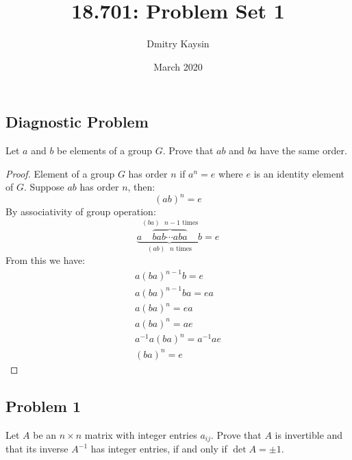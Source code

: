 \documentclass{article}
\title{18.701: Problem Set 1}
\author{Dmitry Kaysin}
\date{March 2020}
\begin{document}
\maketitle 


\subsection*{Diagnostic Problem}

\begin{tcolorbox}
Let $a$ and $b$ be elements of a group $G$. Prove that $ab$ and $ba$ have the same order.
\end{tcolorbox}

\begin{proof}

Element of a group $G$ has order $n$ if $a^n = e$ where $e$ is an identity element of $G$. Suppose $ab$ has order $n$, then:
\[ (ab)^n = e \]
By associativity of group operation:
\[ \underbrace{a\overbrace{bab \cdots aba}^\text{$(ba)$ $n-1$ times} b}_\text{$(ab)$ $n$ times} = e \]
From this we have:
\begin{gather*}
    a(ba)^{n-1}b = e \\
    a(ba)^{n-1}ba = ea \\
    a(ba)^{n} = ea \\
    a(ba)^{n} = ae \\
    a^{-1}a(ba)^{n} = a^{-1}ae \\
    (ba)^{n} = e
\end{gather*}

\end{proof}


\subsection*{Problem 1}

\begin{tcolorbox}
Let $A$ be an $n \times n$ matrix with integer entries $a_{ij}$.
Prove that $A$ is invertible and that its inverse $A^{-1}$ has integer entries, if and only if $\det A = \pm 1$.
\end{tcolorbox}
\end{document}
